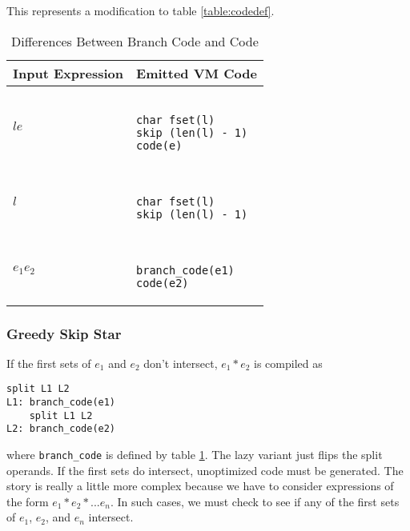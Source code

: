 \begin{table}
\caption{Differences Between Branch Code and Code}
This represents a modification to table \ref{table:codedef}.
\label{table:branchcode}
\centering
\begin{tabular}{| l | l |} \hline
Input Expression & Emitted VM Code \\ \hline
$l e$ &
  \begin{minipage}{4cm}
  \begin{verbatim}

char fset(l)
skip (len(l) - 1)
code(e)
  \end{verbatim}
  \end{minipage}
  \\ \hline
$l$ &
  \begin{minipage}{4cm}
  \begin{verbatim}

char fset(l)
skip (len(l) - 1)
  \end{verbatim}
  \end{minipage}
  \\ \hline
$e_1 e_2$ &
  \begin{minipage}{4cm}
  \begin{verbatim}

branch_code(e1)
code(e2)
  \end{verbatim}
  \end{minipage}
  \\ \hline
\end{tabular}
\end{table}
 
\subsubsection{Greedy Skip Star}

If the first sets of $e_1$ and $e_2$ don't intersect, $e_1*e_2$
is compiled as

\begin{verbatim}
split L1 L2
L1: branch_code(e1)
    split L1 L2
L2: branch_code(e2)
\end{verbatim}

\noindent
where \verb'branch_code' is defined by table \ref{table:branchcode}.
The lazy variant just flips the split operands. If the first
sets do intersect, unoptimized code must be generated. The story
is really a little more complex because we have to consider
expressions of the form $e_1*e_2*...e_n$. In such cases, we must
check to see if any of the first sets of $e_1$, $e_2$, and $e_n$
intersect.

